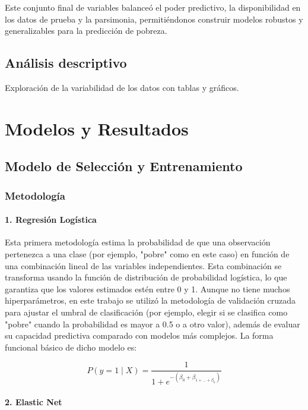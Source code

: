 \documentclass[12pt,a4paper,onecolumn]{article}
\begin{document}
Este conjunto final de variables balanceó el poder predictivo, la disponibilidad en los datos de prueba y la parsimonia, permitiéndonos construir modelos robustos y generalizables para la predicción de pobreza.

\subsection{Análisis descriptivo}
Exploración de la variabilidad de los datos con tablas y gráficos.

\section{Modelos y Resultados}

\subsection{Modelo de Selección y Entrenamiento}

\subsubsection{Metodología}

\paragraph{1. Regresión Logística}

Esta primera metodología estima la probabilidad de que una observación pertenezca a una clase (por ejemplo, "pobre" como en este caso) en función de una combinación lineal de las variables independientes. Esta combinación se transforma usando la función de distribución de probabilidad logística, lo que garantiza que los valores estimados estén entre 0 y 1. Aunque no tiene muchos hiperparámetros, en este trabajo se utilizó la metodología de validación cruzada para ajustar el umbral de clasificación (por ejemplo, elegir si se clasifica como "pobre" cuando la probabilidad es mayor a 0.5 o a otro valor), además de evaluar su capacidad predictiva comparado con modelos más complejos. La forma funcional básico de dicho modelo es:

$$P\left( y = 1 \middle| X \right) = \frac{1}{1 + e^{- (\beta_{0} + \beta_{1 + \ldots + \beta_{k}})}}$$

\paragraph{2. Elastic Net}
\end{document}
